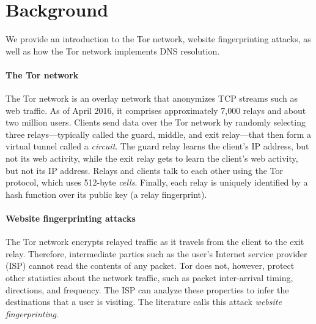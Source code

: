 \section{Background}
\label{sec:background}
We provide an introduction to the Tor network, website fingerprinting
attacks, as well as how the Tor network implements DNS resolution.

\paragraph{The Tor network}
The Tor network is an overlay network that anonymizes TCP streams such as web
traffic.  As of April 2016, it comprises approximately 7,000 relays and about two
million users.  Clients send data over the Tor network by randomly selecting
three relays---typically called the guard, middle, and exit relay---that then
form a virtual tunnel called a \emph{circuit}.  The guard relay learns the
client's IP address, but not its web activity, while the exit relay gets to
learn the client's web activity, but not its IP address.  Relays and clients
talk to each other using the Tor protocol, which uses 512-byte \emph{cells}.
Finally, each relay is uniquely identified by a hash
function over its public key (a relay fingerprint).

\paragraph{Website fingerprinting attacks}
The Tor network encrypts relayed traffic as it travels from the client
to the exit relay.  Therefore, intermediate parties such as the user's
Internet service provider (ISP) cannot read the contents of any packet.
Tor does not, however, protect other statistics about the network
traffic, such as packet inter-arrival timing, directions, and frequency.
The ISP can analyze these properties to infer the destinations that a
user is visiting.  The literature calls this attack \emph{website
  fingerprinting}.

